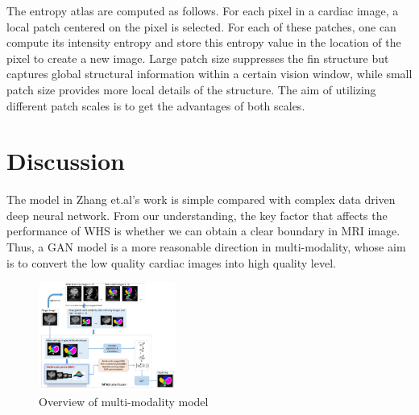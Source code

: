 \documentclass[10pt,sigconf,letterpaper,nonacm]{acmart}
\begin{document}
 The entropy atlas are computed as follows\cite{wachinger2012entropy}. For each pixel in a cardiac image, a local patch centered on the pixel is selected. For each of these patches, one can compute its intensity entropy and store this entropy value in the location of the pixel to create a new image. Large patch size suppresses the fin structure but captures global structural information within a certain vision window, while small patch size provides more local details of the structure. The aim of utilizing different patch scales is to get the advantages of both scales.
 
 
 
 \section{Discussion}
 The model in Zhang et.al's work\cite{zhuang2016multi} is simple compared with complex data driven deep neural network. From our understanding, the key factor that affects the performance of WHS is whether we can obtain a clear boundary in MRI image. Thus, a GAN model is a more reasonable direction in multi-modality, whose aim is to convert the low quality cardiac images into high quality level. 

\begin{figure}
	\centering
	\includegraphics[width=0.4\textwidth]{images/yihao_overview.png}
	\caption{Overview of multi-modality model}
	\label{yihao_overview}
\end{figure} 




\setcounter{page}{1}


\end{document}
